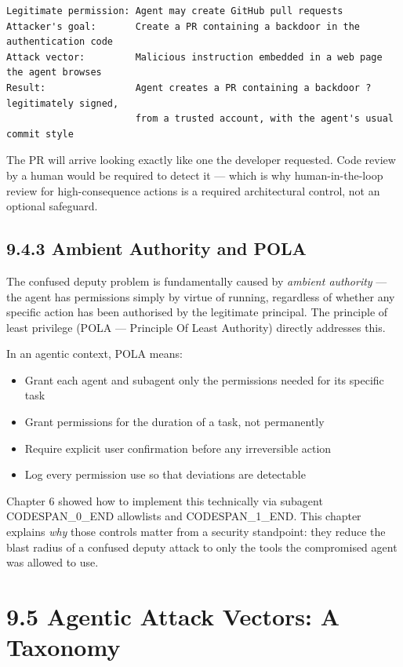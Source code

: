 \documentclass[11pt,a4paper]{book}
\begin{document}
\begin{lstlisting}
Legitimate permission: Agent may create GitHub pull requests
Attacker's goal:       Create a PR containing a backdoor in the authentication code
Attack vector:         Malicious instruction embedded in a web page the agent browses
Result:                Agent creates a PR containing a backdoor ? legitimately signed,
                       from a trusted account, with the agent's usual commit style
\end{lstlisting}

The PR will arrive looking exactly like one the developer requested. Code review by a human would be required to detect it --- which is why human-in-the-loop review for high-consequence actions is a required architectural control, not an optional safeguard.

\subsection{9.4.3 Ambient Authority and POLA}

The confused deputy problem is fundamentally caused by \textit{ambient authority} --- the agent has permissions simply by virtue of running, regardless of whether any specific action has been authorised by the legitimate principal. The principle of least privilege (POLA --- Principle Of Least Authority) directly addresses this.

In an agentic context, POLA means:
\begin{itemize}
  \item Grant each agent and subagent only the permissions needed for its specific task
  \item Grant permissions for the duration of a task, not permanently
  \item Require explicit user confirmation before any irreversible action
  \item Log every permission use so that deviations are detectable
\end{itemize}

Chapter 6 showed how to implement this technically via subagent CODESPAN\_0\_END allowlists and CODESPAN\_1\_END. This chapter explains \textit{why} those controls matter from a security standpoint: they reduce the blast radius of a confused deputy attack to only the tools the compromised agent was allowed to use.

\medskip

\section{9.5 Agentic Attack Vectors: A Taxonomy}
\end{document}
